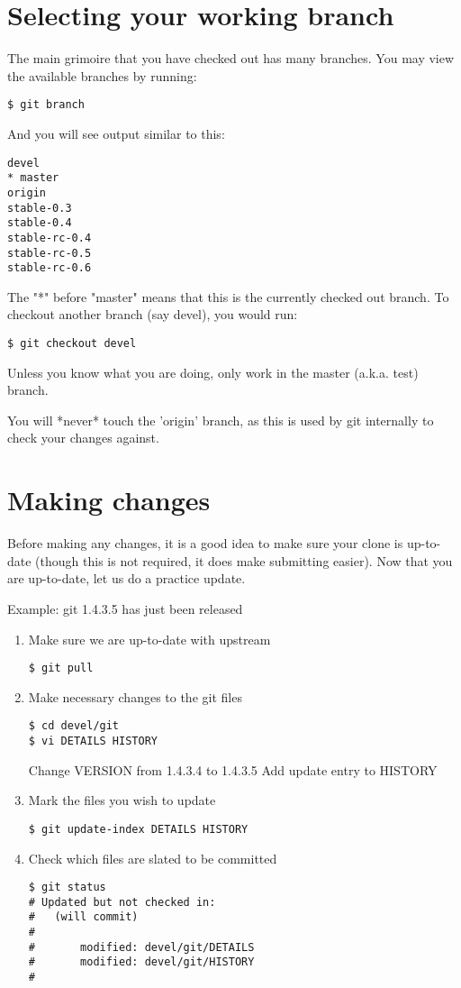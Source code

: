 \documentclass[a4paper,10pt]{book}
\begin{document}
\section{Selecting your working branch}
The main grimoire that you have checked out has many branches. You may view
the available branches by running:
\begin{verbatim}
$ git branch
\end{verbatim}
And you will see output similar to this:

\begin{verbatim}
devel
* master
origin
stable-0.3
stable-0.4
stable-rc-0.4
stable-rc-0.5
stable-rc-0.6
\end{verbatim}

The "*" before "master" means that this is the currently checked out branch.
To checkout another branch (say devel), you would run:
\begin{verbatim}
$ git checkout devel
\end{verbatim}
Unless you know what you are doing, only work in the master (a.k.a. test)
branch.

You will *never* touch the 'origin' branch, as this is used by git
internally to check your changes against.
\section{Making changes}
Before making any changes, it is a good idea to make sure your clone is
up-to-date (though this is not required, it does make submitting easier).
Now that you are up-to-date, let us do a practice update.

Example: git 1.4.3.5 has just been released
\begin{enumerate}
\item Make sure we are up-to-date with upstream
\begin{verbatim}
$ git pull
\end{verbatim}
\item Make necessary changes to the git files
\begin{verbatim}
$ cd devel/git
$ vi DETAILS HISTORY
\end{verbatim}
Change VERSION from 1.4.3.4 to 1.4.3.5
Add update entry to HISTORY
\item Mark the files you wish to update
\begin{verbatim}
$ git update-index DETAILS HISTORY
\end{verbatim}
\item Check which files are slated to be committed
\begin{verbatim}
$ git status
# Updated but not checked in:
#   (will commit)
#
#       modified: devel/git/DETAILS
#       modified: devel/git/HISTORY
#
\end{verbatim}
\end{enumerate}
\end{document}

